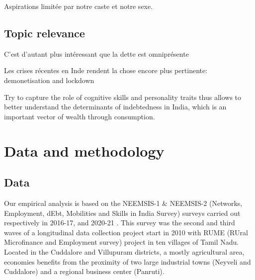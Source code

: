 \documentclass[a4paper, 11pt, onecolumn]{article}
\begin{document}
Aspirations limitée par notre caste et notre sexe.










	\subsection{Topic relevance}



C'est d'autant plus intéressant que la dette est omniprésente \cite{Guerin2013a, Guerin2020}

Les crises récentes en Inde rendent la chose encore plus pertinente: demonetisation \cite{GuerinDemo2017} and lockdown \cite{Guerin2020}

Try to capture the role of cognitive skills and personality traits thus allows to better understand the determinants of indebtedness in India, which is an important vector of wealth through consumption. 












\newpage
\section{Data and methodology}


	\subsection{Data}
	\label{subsection:data}

Our empirical analysis is based on the NEEMSIS-1 \& NEEMSIS-2 (Networks, Employment, dEbt, Mobilities and Skills in India Survey) surveys carried out respectively in 2016-17, and 2020-21 \citep{NEEMSISreport, NEEMSIS2017}.
This survey was the second and third waves of a longitudinal data collection project start in 2010 with RUME (RUral Microfinance and Employment survey) project in ten villages of Tamil Nadu.
Located in the Cuddalore and Villupuram districts, a mostly agricultural area, economies benefits from the proximity of two large industrial towns (Neyveli and Cuddalore) and a regional business center (Panruti).
\end{document}
